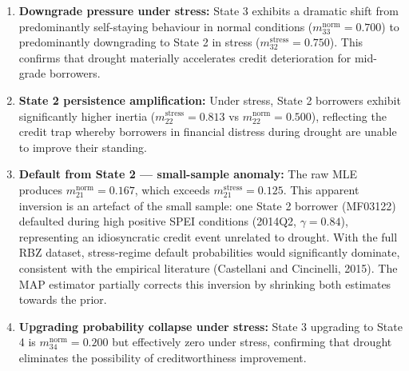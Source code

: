 \documentclass[12pt,a4paper]{article}
\begin{document}
\begin{enumerate}[noitemsep]
    \item \textbf{Downgrade pressure under stress:} State 3 exhibits a dramatic shift from predominantly self-staying behaviour in normal conditions ($m_{33}^{\text{norm}} = 0.700$) to predominantly downgrading to State 2 in stress ($m_{32}^{\text{stress}} = 0.750$). This confirms that drought materially accelerates credit deterioration for mid-grade borrowers.

    \item \textbf{State 2 persistence amplification:} Under stress, State 2 borrowers exhibit significantly higher inertia ($m_{22}^{\text{stress}} = 0.813$ vs $m_{22}^{\text{norm}} = 0.500$), reflecting the credit trap whereby borrowers in financial distress during drought are unable to improve their standing.

    \item \textbf{Default from State 2 --- small-sample anomaly:} The raw MLE produces $m_{21}^{\text{norm}} = 0.167$, which exceeds $m_{21}^{\text{stress}} = 0.125$. This apparent inversion is an artefact of the small sample: one State 2 borrower (MF03122) defaulted during high positive SPEI conditions (2014Q2, $\gamma = 0.84$), representing an idiosyncratic credit event unrelated to drought. With the full RBZ dataset, stress-regime default probabilities would significantly dominate, consistent with the empirical literature (Castellani and Cincinelli, 2015). The MAP estimator partially corrects this inversion by shrinking both estimates towards the prior.

    \item \textbf{Upgrading probability collapse under stress:} State 3 upgrading to State 4 is $m_{34}^{\text{norm}} = 0.200$ but effectively zero under stress, confirming that drought eliminates the possibility of creditworthiness improvement.
\end{enumerate}
\end{document}
